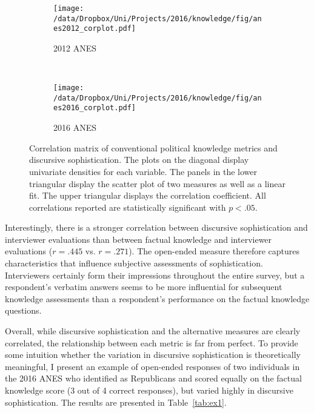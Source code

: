 \begin{figure*}[h]
    \centering
    \begin{subfigure}[t]{0.5\textwidth}
        \centering
        \texttt{[image: /data/Dropbox/Uni/Projects/2016/knowledge/fig/anes2012\_corplot.pdf]}
        \caption{2012 ANES}
    \end{subfigure}%
    ~ 
    \begin{subfigure}[t]{0.5\textwidth}
        \centering
        \texttt{[image: /data/Dropbox/Uni/Projects/2016/knowledge/fig/anes2016\_corplot.pdf]}
        \caption{2016 ANES}
    \end{subfigure}
    \caption[Correlation matrix of conventional political knowledge metrics and discursive sophistication]{Correlation matrix of conventional political knowledge metrics and discursive sophistication. The plots on the diagonal display univariate densities for each variable. The panels in the lower triangular display the scatter plot of two measures as well as a linear fit. The upper triangular displays the correlation coefficient. All correlations reported are statistically significant with $p<.05$.}\label{fig:corplot}
\end{figure*}

Interestingly, there is a stronger correlation between discursive sophistication and interviewer evaluations than between factual knowledge and interviewer evaluations ($r=.445$ vs. $r=.271$). The open-ended measure therefore captures characteristics that influence subjective assessments of sophistication. Interviewers certainly form their impressions throughout the entire survey, but a respondent's verbatim answers seems to be more influential for subsequent knowledge assessments than a respondent's performance on the factual knowledge questions.

Overall, while discursive sophistication and the alternative measures are clearly correlated, the relationship between each metric is far from perfect. To provide some intuition whether the variation in discursive sophistication is theoretically meaningful, I present an example of open-ended responses of two individuals in the 2016 ANES who identified as Republicans and scored equally on the factual knowledge score (3 out of 4 correct responses), but varied highly in discursive sophistication. The results are presented in Table~\ref{tab:ex1}.

